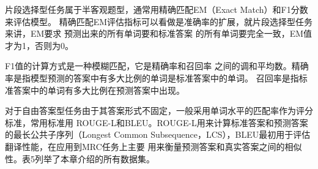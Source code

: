 片段选择型任务属于半客观题型，通常用精确匹配EM（Exact Match）和F1分数来评估模型。
精确匹配EM评估指标可以看做是准确率的扩展，就片段选择型任务来讲，EM要求
预测出来的所有单词要和标准答案
的所有单词要完全一致，EM值才为1，否则为0。

F1值的计算方式是一种模糊匹配，它是精确率和召回率
之间的调和平均数。精确率是指模型预测的答案中有多大比例的单词是标准答案中的单词。
召回率是指标准答案中的单词有多大比例在预测答案中出现。


对于自由答案型任务由于其答案形式不固定，一般采用单词水平的匹配率作为评分标准，常用标准用
ROUGE-L和BLEU。ROUGE-L用来计算标准答案和预测答案的最长公共子序列（Longest Common Subsequence，LCS），BLEU最初用于评估翻译性能，在应用到MRC任务上主要
用来衡量预测答案和真实答案之间的相似性。表5列举了本章介绍的所有数据集。



